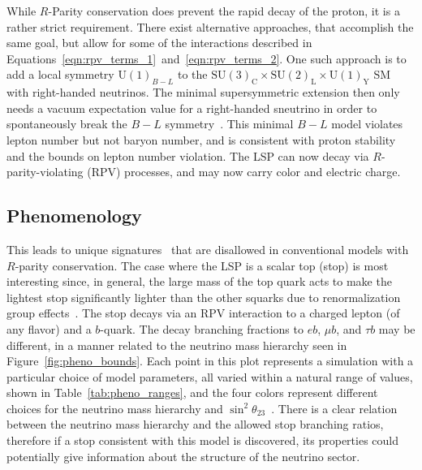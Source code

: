 While $R$-Parity conservation does prevent the rapid decay of the proton, it is
a rather strict requirement.
There exist alternative approaches, that accomplish the same goal, but allow
for some of the interactions described in
Equations~\ref{eqn:rpv_terms_1}~and~\ref{eqn:rpv_terms_2}.
One such approach is to add a local symmetry $\mathrm{U}(1)_{B-L}$ to the
$\mathrm{SU}(3)_\mathrm{C} \times
\mathrm{SU}(2)_\mathrm{L} \times
\mathrm{U}(1)_\mathrm{Y}$ SM with right-handed neutrinos.
The minimal supersymmetric extension then only needs a vacuum expectation value
for a right-handed sneutrino in order to spontaneously break the
$B-L$ symmetry~\cite{FileviezPerez:2008sx, Barger:2008wn, FileviezPerez:2009gr,
Everett:2009vy, Evans:1986ada, Lukas:1998yy, Braun:2005ux, Braun:2005nv,
Braun:2006ae, Ambroso:2009jd, Ambroso:2010pe, Ovrut:2012wg}.
This minimal $B-L$ model violates lepton number but not baryon number, and is
consistent with proton stability and the bounds on lepton number violation.
The LSP can now decay via $R$-parity-violating (RPV) processes, and may now
carry color and electric charge.

\FloatBarrier
\subsection{Phenomenology}

This leads to unique signatures~\cite{FileviezPerez:2012mj, Perez:2013kla,
Ovrut:2012wg, Ovrut:2014rba, Ovrut:2015uea} that are disallowed in conventional
models with $R$-parity conservation.
The case where the LSP is a scalar top (stop) is most interesting
since, in general, the large mass of the top quark acts to make the
lightest stop significantly lighter than the other squarks due to
renormalization group effects~\cite{Barbieri:1987fn,deCarlos:1993yy}.
The stop decays via an RPV interaction to a charged lepton (of any
flavor) and a $b$-quark.
The decay branching fractions to $e b$, $\mu b$, and $\tau b$ may be different,
in a manner related to the neutrino mass
hierarchy seen in Figure~\ref{fig:pheno_bounds}.
Each point in this plot represents a simulation with a particular choice of
model parameters, all varied within a natural range of values, shown in
Table~\ref{tab:pheno_ranges}, and the four colors represent different choices
for the neutrino mass hierarchy and 
$\sin^2\theta_{23}$~\cite{Marshall:2014cwa,Marshall:2014kea}.
There is a clear relation between the neutrino mass hierarchy and the allowed
stop branching ratios, therefore if a stop consistent with this model is
discovered, its properties could potentially give information about the
structure of the neutrino sector.

